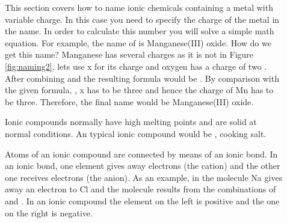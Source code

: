 \documentclass[main.tex]{subfiles}
\begin{document}
\begin{description}
\item[] This section covers how to name ionic chemicals containing a metal with variable charge. In this case you need to specify the charge of the metal in the name. In order to calculate this number you will solve a simple math equation. For example, the name of  is Manganese(III) oxide. How do we get this name? Manganese has several charges as it is not in Figure \ref{fig:naming2}, lets use x for its charge  and oxygen has a charge of two . After combining  and  the resulting formula would be  . By comparison with the given formula,  , x has to be three and hence the charge of Mn has to be three. Therefore, the final name would be Manganese(III) oxide.

\item[] Ionic compounds normally have high melting points and are solid at normal conditions. An typical ionic compound would be , cooking salt.
\item[] Atoms of an ionic compound are connected by means of an ionic bond. In an ionic bond, one element gives away electrons (the cation) and the other one receives electrons (the anion). As an example, in the  molecule Na gives away an electron to Cl and the molecule results from the combinations of  and . In an ionic compound the element on the left is positive and the one on the right is negative.

\end{description}
\end{document}
